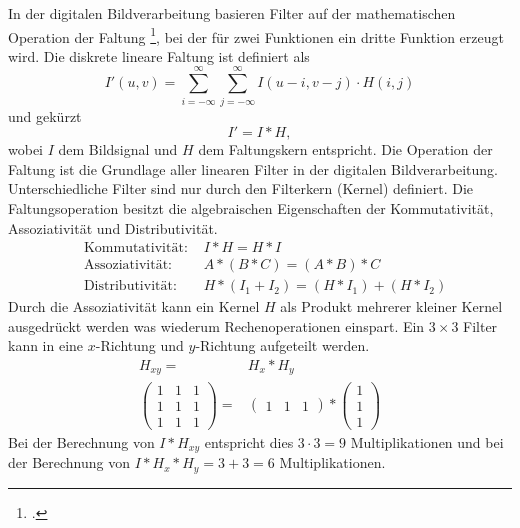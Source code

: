 In der digitalen Bildverarbeitung basieren Filter auf der mathematischen Operation der Faltung
\footcite[Vgl.][S.~101--104]{burger05}, bei der für zwei Funktionen ein dritte Funktion erzeugt wird. Die diskrete
 lineare Faltung ist definiert als
\begin{equation}
	I'\left(u,v\right) =
	\sum \limits_{i = -\infty}^{\infty}
	\sum \limits_{j = -\infty}^{\infty}
	I\left(u - i, v - j\right) \cdot H\left(i,j\right)
\end{equation}
und gekürzt
\begin{equation}
	I' = I * H,
\end{equation}
wobei $I$ dem Bildsignal und $H$ dem Faltungskern entspricht. Die Operation der Faltung ist die Grundlage aller
 linearen Filter in der digitalen Bildverarbeitung. Unterschiedliche Filter sind nur durch den Filterkern (Kernel)
 definiert. Die Faltungsoperation besitzt die algebraischen Eigenschaften der Kommutativität, Assoziativität und
 Distributivität.
\begin{align}
	&\text{Kommutativität: } &I * H = H * I\\
	&\text{Assoziativität: } &A * (B * C) = (A * B) * C\\
	&\text{Distributivität: } &H * \left(I_1 + I_2\right) = \left(H * I_1\right) + \left(H * I_2\right)
\end{align}
Durch die Assoziativität kann ein Kernel $H$ als Produkt mehrerer kleiner Kernel ausgedrückt werden was wiederum
 Rechenoperationen einspart. Ein $3 \times 3$ Filter kann in eine $x$-Richtung und $y$-Richtung aufgeteilt werden.
\begin{align}
	H_{xy} = & H_x * H_y\\
	\begin{pmatrix}
		1& 1& 1\\
		1& 1& 1\\
		1& 1& 1
	\end{pmatrix} = &
	\begin{pmatrix}
		1& 1& 1
	\end{pmatrix}
	*
	\begin{pmatrix}
		1\\
		1\\
		1
	\end{pmatrix}
\end{align}
Bei der Berechnung von $I * H_{xy}$ entspricht dies $3 \cdot 3 = 9$ Multiplikationen und bei der Berechnung von
 $I * H_x * H_y = 3 + 3 = 6$ Multiplikationen.


